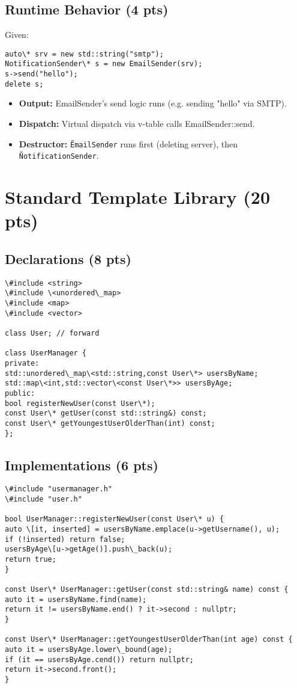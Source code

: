 \documentclass[12pt]{article}
\begin{document}
\subsection{Runtime Behavior (4 pts)}
Given:
\begin{lstlisting}
auto\* srv = new std::string("smtp");
NotificationSender\* s = new EmailSender(srv);
s->send("hello");
delete s;
\end{lstlisting}
\begin{itemize}
\item \textbf{Output:} EmailSender’s send logic runs (e.g. sending "hello" via SMTP).
\item \textbf{Dispatch:} Virtual dispatch via v-table calls EmailSender::send.
\item \textbf{Destructor:} \texttt{\~EmailSender} runs first (deleting server), then \texttt{\~NotificationSender}.
\end{itemize}

\section{Standard Template Library (20 pts)}
\subsection{Declarations (8 pts)}
\begin{lstlisting}
\#include <string>
\#include \<unordered\_map>
\#include <map>
\#include <vector>

class User; // forward

class UserManager {
private:
std::unordered\_map\<std::string,const User\*> usersByName;
std::map\<int,std::vector\<const User\*>> usersByAge;
public:
bool registerNewUser(const User\*);
const User\* getUser(const std::string&) const;
const User\* getYoungestUserOlderThan(int) const;
};
\end{lstlisting}

\subsection{Implementations (6 pts)}
\begin{lstlisting}
\#include "usermanager.h"
\#include "user.h"

bool UserManager::registerNewUser(const User\* u) {
auto \[it, inserted] = usersByName.emplace(u->getUsername(), u);
if (!inserted) return false;
usersByAge\[u->getAge()].push\_back(u);
return true;
}

const User\* UserManager::getUser(const std::string& name) const {
auto it = usersByName.find(name);
return it != usersByName.end() ? it->second : nullptr;
}

const User\* UserManager::getYoungestUserOlderThan(int age) const {
auto it = usersByAge.lower\_bound(age);
if (it == usersByAge.cend()) return nullptr;
return it->second.front();
}
\end{lstlisting}
\end{document}
